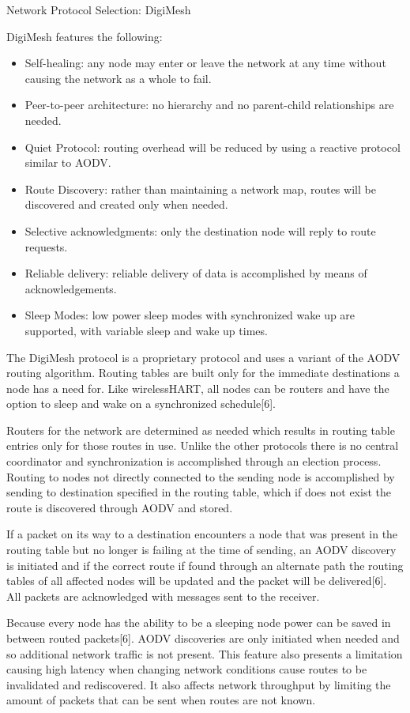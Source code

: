 \documentclass[journal]{IEEEtran}
\begin{document}
Network Protocol Selection: DigiMesh

DigiMesh features the following:
\begin{itemize}
  \item Self-healing: any node may enter or leave the network at any time without causing the network as a whole to fail.
  \item Peer-to-peer architecture: no hierarchy and no parent-child relationships are needed.
  \item Quiet Protocol: routing overhead will be reduced by using a reactive protocol similar to AODV.
  \item Route Discovery: rather than maintaining a network map, routes will be discovered and created only when needed.
  \item Selective acknowledgments: only the destination node will reply to route requests.
  \item Reliable delivery: reliable delivery of data is accomplished by means of acknowledgements.
  \item Sleep Modes: low power sleep modes with synchronized wake up are supported, with variable sleep and wake up times.
\end{itemize}

The DigiMesh protocol is a proprietary protocol and uses a variant of the AODV routing algorithm. Routing tables are built only for the immediate destinations a node has a need for.  Like wirelessHART, all nodes can be routers and have the option to sleep and wake on a synchronized schedule[6].

Routers for the network are determined as needed which results in routing table entries only for those routes in use. Unlike the other protocols there is no central coordinator and synchronization is accomplished through an election process.  Routing to nodes not directly connected to the sending node is accomplished by sending to destination specified in the routing table, which if does not exist the route is discovered through AODV and stored.

If a packet on its way to a destination encounters a node that was present in the routing table but no longer is failing at the time of sending, an AODV discovery is initiated and if the correct route if found through an alternate path the routing tables of all affected nodes will be updated and the packet will be delivered[6].  All packets are acknowledged with messages sent to the receiver.

Because every node has the ability to be a sleeping node power can be saved in between routed packets[6].  AODV discoveries are only initiated when needed and so additional network traffic is not present.  This feature also presents a limitation causing high latency when changing network conditions cause routes to be invalidated and rediscovered. It also affects network throughput by limiting the amount of packets that can be sent when routes are not known.
\end{document}
